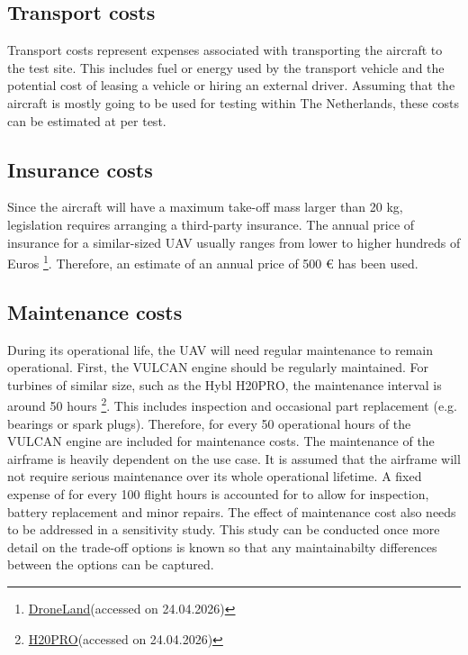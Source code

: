 \subsection{Transport costs}
Transport costs represent expenses associated with transporting the aircraft to the test site. This includes fuel or energy used by the transport vehicle and the potential cost of leasing a vehicle or hiring an external driver. Assuming that the aircraft is mostly going to be used for testing within The Netherlands, these costs can be estimated at  per test.
\subsection{Insurance costs}
Since the aircraft will have a maximum take-off mass larger than 20 kg, legislation requires arranging a third-party insurance. The annual price of insurance for a similar-sized UAV usually ranges from lower to higher hundreds of Euros \footnote{\href{https://droneland.nl/insurance?___store=en}{DroneLand}(accessed on 24.04.2026)}. Therefore, an estimate of an annual price of 500 € has been used.
\subsection{Maintenance costs}
\label{subsec: Maintenance}
During its operational life, the UAV will need regular maintenance to remain operational. First, the VULCAN engine should be regularly maintained. For turbines of similar size, such as the Hybl H20PRO, the maintenance interval is around 50 hours \footnote{\href{https://www.hyblturbines.cz/h16bl/}{H20PRO}(accessed on 24.04.2026)}. This includes inspection and occasional part replacement (e.g. bearings or spark plugs). Therefore,  for every 50 operational hours of the VULCAN engine are included for maintenance costs. The maintenance of the airframe is heavily dependent on the use case. It is assumed that the airframe will not require serious maintenance over its whole operational lifetime. A fixed expense of  for every 100 flight hours is accounted for to allow for inspection, battery replacement and minor repairs. The effect of maintenance cost also needs to be addressed in a sensitivity study. This study can be conducted once more detail on the trade-off options is known so that any maintainabilty differences between the options can be captured.

